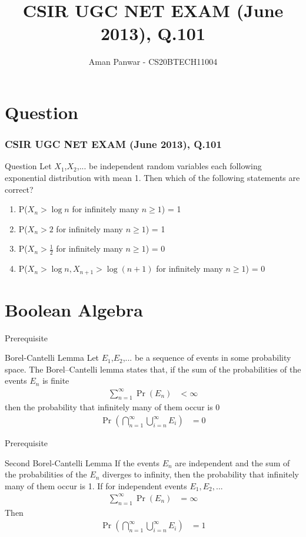 \documentclass{beamer}
\title{ CSIR UGC NET EXAM (June 2013),
Q.101}
\author{Aman Panwar - CS20BTECH11004}
\providecommand{\pr}[1]{\ensuremath{\Pr\left(#1\right)}}
\providecommand{\pr}[1]{\ensuremath{\Pr\left(#1\right)}}
\theoremstyle{remark}
\numberwithin{equation}{subsection}
\begin{document}
\begin{frame}
\titlepage
\end{frame}
\section{Question}
\begin{frame}
\frametitle{ CSIR UGC NET EXAM (June 2013),
Q.101}
\begin{block}{Question}
Let $X_1$,$X_2$,... be independent random variables each following exponential distribution with mean 1. Then which of the following statements are correct?
\begin{enumerate}
    \item P($X_n > \log n$ for infinitely many $n \geq 1$) = 1
    \item P($X_n > 2$ for infinitely many $n \geq 1$) = 1
    \item P($X_n > \frac{1}{2}$ for infinitely many $n \geq 1$) = 0
    \item P($X_n > \log n, X_{n+1}>\log (n+1)$ for infinitely many $n \geq 1$) = 0
\end{enumerate}
\end{block}
\end{frame}

\section{Boolean Algebra}
\begin{frame}{Prerequisite}
\begin{block}{Borel-Cantelli Lemma}
     Let $E_1$,$E_2$,... be a sequence of events in some probability space. The Borel–Cantelli lemma states that, if the sum of the probabilities of the events $E_n$ is finite
\begin{align}
    \sum_{n=1}^{\infty}\pr{E_n}&<\infty
\end{align}
then the probability that infinitely many of them occur is 0
\begin{align}
    \pr{\bigcap_{n=1}^{\infty}\bigcup_{i=n}^{\infty}E_{i}}&=0
\end{align}
\end{block}
\end{frame}


\begin{frame}{Prerequisite}
\begin{block}{Second Borel-Cantelli Lemma}
     If the events $E_n$ are independent and the sum of the probabilities of the $E_n$ diverges to infinity, then the probability that infinitely many of them occur is 1.
If for independent events $E_1,E_2,...$
\begin{align}
    \sum_{n=1}^{\infty}\pr{E_n}&=\infty
\end{align}
Then
\begin{align}
    \pr{\bigcap_{n=1}^{\infty}\bigcup_{i=n}^{\infty}E_{i}}&=1
\end{align}
\end{block}
\end{frame}
\end{document}
